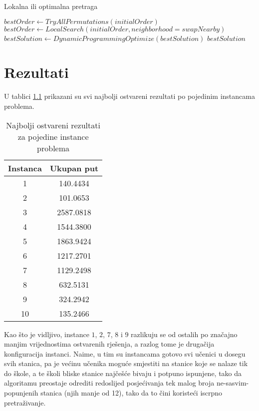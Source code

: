 \documentclass[times, utf8, seminar, numeric]{fer}
\begin{document}
\begin{algorithm}[H]
	\caption{Lokalna ili optimalna pretraga}
	\label{alg1}
	\begin{algorithmic}
				\State $bestOrder \gets TryAllPermutations(initialOrder)$
			\Else 
				\State $bestOrder \gets LocalSearch(initialOrder, neighborhood=swapNearby)$
			\EndIf
			\State $bestSolution \gets DynamicProgrammingOptimize(bestSolution)$
			\State \Return $bestSolution$
		\EndFunction
	\end{algorithmic}
\end{algorithm}

\chapter{Rezultati}

U tablici \ref{table1} prikazani su svi najbolji ostvareni rezultati po pojedinim instancama problema.

\begin{table}[h!]
	\caption{Najbolji ostvareni rezultati za pojedine instance problema}
	\label{table1}
	\begin{center}
		\begin{tabular}{|c c|} 
			\hline
			Instanca & Ukupan put \\ [0.5ex] 
			\hline\hline
			1 & 140.4434 \\ 
			\hline
			2 & 101.0653 \\
			\hline
			3 & 2587.0818\\
			\hline
			4 & 1544.3800 \\
			\hline
			5 & 1863.9424 \\
			\hline
			6 & 1217.2701 \\
			\hline
			7 & 1129.2498 \\
			\hline
			8 & 632.5131 \\
			\hline
			9 & 324.2942 \\
			\hline
			10 & 135.2466 \\
			\hline
		\end{tabular}
	\end{center}
\end{table}

Kao što je vidljivo, instance $1$, $2$, $7$, $8$ i $9$ razlikuju se od ostalih po značajno manjim vrijednostima ostvarenih rješenja, a razlog tome je drugačija konfiguracija instanci. Naime, u tim su instancama gotovo svi učenici u dosegu svih stanica, pa je većinu učenika moguće smjestiti na stanice koje se nalaze tik do škole, a te školi bliske stanice najčešće bivaju i potpuno ispunjene, tako da algoritamu preostaje odrediti redoslijed posjećivanja tek malog broja ne-sasvim-popunjenih stanica (njih manje od 12), tako da to čini koristeći iscrpno pretraživanje.
\end{document}
